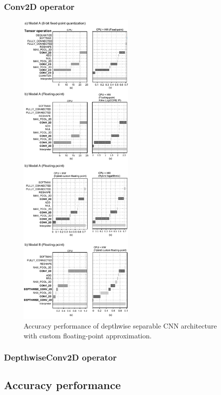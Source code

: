 \subsubsection{Conv2D operator}
\begin{figure}[t!]
	\centering
	\includegraphics[width=0.5\textwidth]{../figures/inference_schedule.pdf}
	\caption{Accuracy performance of depthwise separable CNN architecture with custom floating-point approximation.}
	\label{fig:fixed_point}
\end{figure}
\subsubsection{DepthwiseConv2D operator}
\subsection{Accuracy performance}


